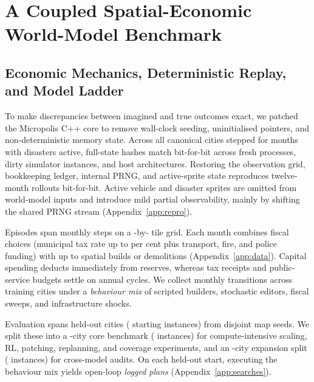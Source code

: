 \section{A Coupled Spatial-Economic World-Model Benchmark}\label{sec:setting}

\subsection{Economic Mechanics, Deterministic Replay, and Model Ladder}\label{sec:engine}\label{sec:emulator}

To make discrepancies between imagined and true outcomes exact, we patched the Micropolis C++ core to remove wall-clock seeding, uninitialised pointers, and non-deterministic memory state. Across all \OracleCities{} canonical cities stepped for \OracleMonths{} months with disasters active, full-state hashes match bit-for-bit across fresh processes, dirty simulator instances, and host architectures. Restoring the observation grid, bookkeeping ledger, internal PRNG, and active-sprite state reproduces twelve-month rollouts bit-for-bit. Active vehicle and disaster sprites are omitted from world-model inputs and introduce mild partial observability, mainly by shifting the shared PRNG stream (Appendix~\ref{app:repro}).

Episodes span \Horizon{} monthly steps on a \WorldW{}-by-\WorldH{} tile grid. Each month combines fiscal choices (municipal tax rate up to \TaxMax{} per cent plus transport, fire, and police funding) with up to \MacrosPerMonth{} spatial builds or demolitions (Appendix~\ref{app:data}). Capital spending deducts immediately from reserves, whereas tax receipts and public-service budgets settle on annual cycles. We collect \TrainTransitions{} monthly transitions across \TrainFamilies{} training cities under a \emph{behaviour mix} of scripted builders, stochastic editors, fiscal sweeps, and infrastructure shocks.

Evaluation spans \AllCities{} held-out cities (\AllInstances{} starting instances) from disjoint map seeds. We split these into a \HeldOutFamilies-city core benchmark (\MainInstances{} instances) for compute-intensive scaling, RL, patching, replanning, and coverage experiments, and an \XCities-city expansion split (\XInstances{} instances) for cross-model audits. On each held-out start, executing the behaviour mix yields \PrLoggedPerStart{} open-loop \emph{logged plans} (Appendix~\ref{app:searches}).

